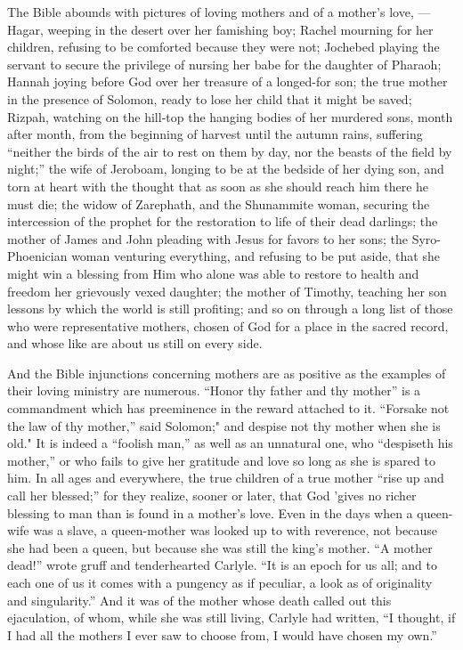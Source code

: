 \documentclass[
]{book}
\begin{document}
The Bible abounds with pictures of loving mothers and of a mother's love, --- Hagar, weeping in the desert over her famishing boy; Rachel mourning for her children, refusing to be comforted because they were not; Jochebed playing the servant to secure the privilege of nursing her babe for the daughter of Pharaoh; Hannah joying before God over her treasure of a longed-for son; the true mother in the presence of Solomon, ready to lose her child that it might be saved; Rizpah, watching on the hill-top the hanging bodies of her murdered sons, month after month, from the beginning of harvest until the autumn rains, suffering ``neither the birds of the air to rest on them by day, nor the beasts of the field by night;'' the wife of Jeroboam, longing to be at the bedside of her dying son, and torn at heart with the thought that as soon as she should reach him there he must die; the widow of Zarephath, and the Shunammite woman, securing the intercession of the prophet for the restoration to life of their dead darlings; the mother of James and John pleading with Jesus for favors to her sons; the Syro-Phoenician woman venturing everything, and refusing to be put aside, that she might win a blessing from Him who alone was able to restore to health and freedom her grievously vexed daughter; the mother of Timothy, teaching her son lessons by which the world is still profiting; and so on through a long list of those who were representative mothers, chosen of God for a place in the sacred record, and whose like are about us still on every side.

And the Bible injunctions concerning mothers are as positive as the examples of their loving ministry are numerous. ``Honor thy father and thy mother'' is a commandment which has preeminence in the reward attached to it. ``Forsake not the law of thy mother,'' said Solomon;" and despise not thy mother when she is old." It is indeed a ``foolish man,'' as well as an unnatural one, who ``despiseth his mother,'' or who fails to give her gratitude and love so long as she is spared to him. In all ages and everywhere, the true children of a true mother ``rise up and call her blessed;'' for they realize, sooner or later, that God 'gives no richer blessing to man than is found in a mother's love. Even in the days when a queen-wife was a slave, a queen-mother was looked up to with reverence, not because she had been a queen, but because she was still the king's mother. ``A mother dead!'' wrote gruff and tenderhearted Carlyle. ``It is an epoch for us all; and to each one of us it comes with a pungency as if peculiar, a look as of originality and singularity.'' And it was of the mother whose death called out this ejaculation, of whom, while she was still living, Carlyle had written, ``I thought, if I had all the mothers I ever saw to choose from, I would have chosen my own.''
\end{document}
